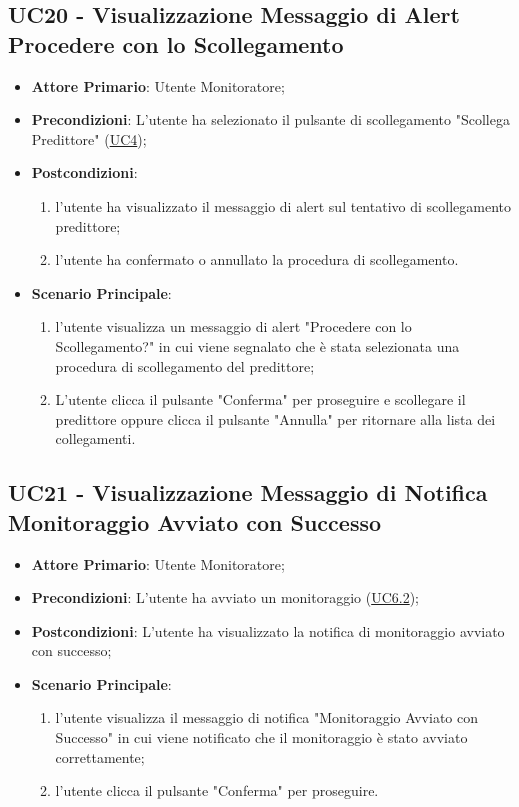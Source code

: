 	\subsection{UC20 - Visualizzazione Messaggio di Alert Procedere con lo Scollegamento}
		\begin{itemize}
			\item\textbf{Attore Primario}: Utente Monitoratore;
			\item\textbf{Precondizioni}: L’utente ha selezionato il pulsante di scollegamento "Scollega Predittore" (\hyperref[par:UC4]{UC4});
			\item\textbf{Postcondizioni}:
				\begin{enumerate}
					\item l'utente ha visualizzato il messaggio di alert sul tentativo di scollegamento predittore;
					\item l'utente ha confermato o annullato la procedura di scollegamento. 
				\end{enumerate}
			\item\textbf{Scenario Principale}: 
				\begin{enumerate} 
					\item l’utente visualizza un messaggio di alert "Procedere con lo Scollegamento?" in cui viene segnalato che è stata selezionata una procedura di scollegamento del predittore;
					\item L'utente clicca il pulsante "Conferma" per proseguire e scollegare il predittore oppure clicca il pulsante "Annulla" per ritornare alla lista dei collegamenti.
				\end{enumerate}
		\end{itemize}	


	\label{par:UC21}
	\subsection{UC21 - Visualizzazione Messaggio di Notifica Monitoraggio Avviato con Successo}	
		\begin{itemize}
			\item\textbf{Attore Primario}: Utente Monitoratore;
			\item\textbf{Precondizioni}: L’utente ha avviato un monitoraggio (\hyperref[par:UC6.2]{UC6.2});
			\item\textbf{Postcondizioni}: L’utente ha visualizzato la notifica di monitoraggio avviato con successo; 
			\item\textbf{Scenario Principale}: 
				\begin{enumerate} 
					\item l’utente visualizza il messaggio di notifica "Monitoraggio Avviato con Successo" in cui viene notificato che il monitoraggio è stato avviato correttamente;
					\item l'utente clicca il pulsante "Conferma" per proseguire.		
				\end{enumerate}		
		\end{itemize}

